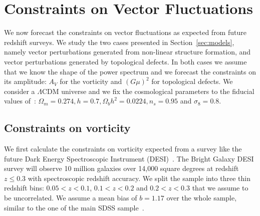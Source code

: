 \documentclass[a4paper,twocolumn,aps,prd,nolongbibliography,superscriptaddress,showpacs,showkeys,amsmath,amssymb,floatfix,nofootinbib]{revtex4-1}
\renewcommand{\[}{\begin{equation}}
\renewcommand{\]}{\end{equation}}
\begin{document}
\section{Constraints on Vector Fluctuations\label{sec:fisher}}

We now forecast the constraints on vector fluctuations as expected from future redshift surveys. We study the two cases presented in Section~\ref{sec:models}, namely vector perturbations generated from non-linear structure formation, and vector perturbations generated by topological defects. In both cases we assume that we know the shape of the power spectrum and we forecast the constraints on its amplitude: $A_V$ for the vorticity and $(G \mu)^2$ for topological defects. We consider a $\Lambda$CDM universe and we fix the cosmological parameters to the fiducial values of~\cite{2014MNRAS.441...24A}: $\Omega_m = 0.274, h = 0.7, \Omega_b h^2 = 0.0224, n_s = 0.95$ and $\sigma_8 = 0.8$.

\subsection{Constraints on vorticity} 
\label{sec:vorticity}

We first calculate the constraints on vorticity expected from a survey like the future Dark Energy Spectroscopic Instrument (DESI)~\cite{Aghamousa:2016zmz}. The Bright Galaxy DESI survey will observe 10 million galaxies over 14,000 square degrees at redshift $z\leq 0.3$ with spectroscopic redshift accuracy. We split the sample into three thin redshift bins: $0.05 < z < 0.1$, $0.1 < z < 0.2$ and $0.2 < z < 0.3$ that we assume to be uncorrelated. We assume a mean bias of $b = 1.17$ over the whole sample, similar to the one of the main SDSS sample~\cite{Percival:2006gt}. 
\end{document}
